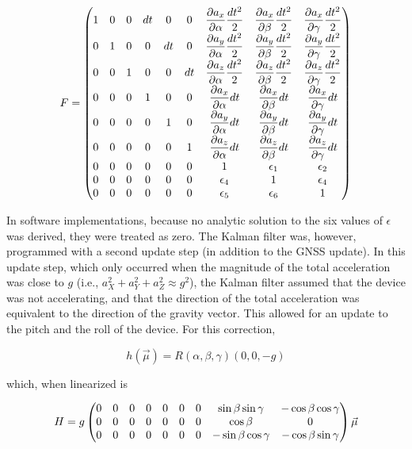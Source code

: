 \documentclass[10pt]{article}
\begin{document}
\begin{equation}
F = \begin{pmatrix}
1 & 0 & 0 & dt & 0 & 0 & \dfrac{\partial a_{x}}{\partial {\alpha}} \dfrac{dt^2}{2} & \dfrac{\partial a_{x}}{\partial {\beta}} \dfrac{dt^2}{2} & \dfrac{\partial a_{x}}{\partial {\gamma}} \dfrac{dt^2}{2} \\
0 & 1 & 0 & 0 & dt & 0 & \dfrac{\partial a_{y}}{\partial {\alpha}} \dfrac{dt^2}{2} & \dfrac{\partial a_{y}}{\partial {\beta}} \dfrac{dt^2}{2} & \dfrac{\partial a_{y}}{\partial {\gamma}} \dfrac{dt^2}{2} \\
0 & 0 & 1 & 0 & 0 & dt & \dfrac{\partial a_{z}}{\partial {\alpha}} \dfrac{dt^2}{2} & \dfrac{\partial a_{z}}{\partial {\beta}} \dfrac{dt^2}{2} & \dfrac{\partial a_{z}}{\partial {\gamma}} \dfrac{dt^2}{2} \\
0 & 0 & 0 & 1 & 0 & 0 & \dfrac{\partial a_{x}}{\partial {\alpha}} dt & \dfrac{\partial a_{x}}{\partial {\beta}} dt & \dfrac{\partial a_{x}}{\partial {\gamma}} dt \\
0 & 0 & 0 & 0 & 1 & 0 & \dfrac{\partial a_{y}}{\partial {\alpha}} dt & \dfrac{\partial a_{y}}{\partial {\beta}} dt & \dfrac{\partial a_{y}}{\partial {\gamma}} dt \\
0 & 0 & 0 & 0 & 0 & 1 & \dfrac{\partial a_{z}}{\partial {\alpha}} dt & \dfrac{\partial a_{z}}{\partial {\beta}} dt & \dfrac{\partial a_{z}}{\partial {\gamma}} dt \\
0 & 0 & 0 & 0 & 0 & 0 & 1 & \epsilon_1 & \epsilon_2  \\
0 & 0 & 0 & 0 & 0 & 0 & \epsilon_4 & 1 & \epsilon_4  \\
0 & 0 & 0 & 0 & 0 & 0 & \epsilon_5 & \epsilon_6 & 1  \\
\end{pmatrix}
\end{equation}

In software implementations, because no analytic solution to the six values of $\epsilon$ was derived, they were treated as zero. The Kalman filter was, however, programmed with a second update step (in addition to the GNSS update). In this update step, which only occurred when the magnitude of the total acceleration was close to $g$ (i.e., $a_X^2 + a_Y^2 + a_Z^2 \approx g^2$), the Kalman filter assumed that the device was not accelerating, and that the direction of the total acceleration was equivalent to the direction of the gravity vector. This allowed for an update to the pitch and the roll of the device. For this correction, 

\begin{equation}
  h(\vec\mu) = R(\alpha, \beta, \gamma) (0, 0, -g)
\end{equation}

which, when linearized is

\begin{equation}
H = g\begin{pmatrix}
0 & 0 & 0& 0& 0& 0& 0& \sin\beta\sin\gamma & -\cos\beta\cos\gamma \\
0 & 0 & 0& 0& 0& 0& 0& \cos\beta & 0 \\
0 & 0 & 0& 0& 0& 0& 0& -\sin\beta\cos\gamma & -\cos\beta\sin\gamma \\
\end{pmatrix}
\vec \mu
\end{equation}
\end{document}
